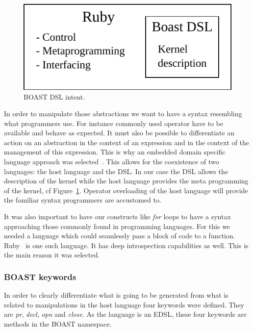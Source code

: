 \documentclass[review]{elsarticle}
\begin{document}
\begin{figure}
\begin{center}
\includegraphics[scale=0.8]{BOAST_DSL.pdf}
\caption{BOAST DSL intent.}
\label{fig:dsl}
\end{center}
\end{figure}

In order to manipulate those abstractions we want to have a syntax resembling
what programmers use. For instance commonly used operator have to be available
and behave as expected. It must also be possible to differentiate an action on
an abstraction in the context of an expression and in the context of the
management of this expression. This is why an embedded domain specific language
approach was selected~\cite{hudak1996building}. This allows for the coexistence
of two languages: the host language and the DSL. In our case the DSL allows the
description of the kernel while the host language provides the meta programming
of the kernel, cf Figure~\ref{fig:dsl}. Operator overloading of the host
language will provide the familiar syntax programmers are accustomed to.

It was also important to have our constructs like \emph{for} loops to have a
syntax approaching those commonly found in programming languages. For this we
needed a language which could seamlessly pass a block of code to a function.
Ruby~\cite{matsumoto2002ruby} is one such language. It has deep introspection
capabilities as well. This is the main reason it was selected.

    \subsubsection{BOAST keywords}


In order to clearly differentiate what is going to be generated from what is
related to manipulations in the host language four keywords were defined. They
are \emph{pr}, \emph{decl}, \emph{opn} and \emph{close}. As the language is
an EDSL, these four keywords are methods in the BOAST namespace.
\end{document}
